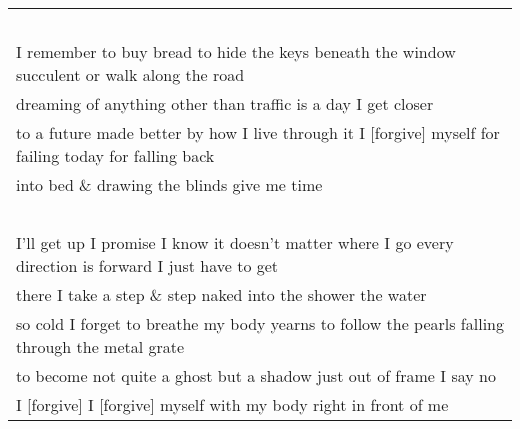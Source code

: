 \begin{center}
\begin{tabular}{l}
\-\ \\ I remember to buy bread \indent to hide the keys \indent beneath the window succulent or walk along the road\\
dreaming of anything other than traffic \indent is a day I get closer\\
to a future made better by how I live through it \indent I [forgive] myself for failing today \indent for falling back\\
into bed \& drawing the blinds \indent give me time\\

\-\ \\ I’ll get up I promise \indent I know it doesn’t matter where I go \indent every direction is forward I just have to get\\
there \indent I take a step \indent \& step naked into the shower \indent the water\\
so cold I forget to breathe \indent my body yearns to follow the pearls \indent falling through the metal grate\\
to become not quite a ghost \indent but a shadow just out of frame \indent I say no\\
I [forgive] \indent I [forgive] myself \indent with my body right in front of me
\end{tabular}
\end{center}